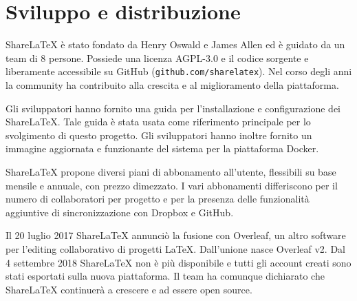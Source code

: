 \section{Sviluppo e distribuzione}
ShareLaTeX è stato fondato da Henry Oswald e James Allen ed è guidato da un team di 8 persone. Possiede una licenza AGPL-3.0 e il codice sorgente e liberamente accessibile su GitHub (\verb|github.com/sharelatex|). Nel corso degli anni la community ha contribuito alla crescita e al miglioramento della piattaforma.

Gli sviluppatori hanno fornito una guida per l'installazione e configurazione dei ShareLaTeX. Tale guida è stata usata come riferimento principale per lo svolgimento di questo progetto. Gli sviluppatori hanno inoltre fornito un immagine aggiornata e funzionante del sistema per la piattaforma Docker.

ShareLaTeX propone diversi piani di abbonamento all'utente, flessibili su base mensile e annuale, con prezzo dimezzato. I vari abbonamenti differiscono per il numero di collaboratori per progetto e per la presenza delle funzionalità aggiuntive di sincronizzazione con Dropbox e GitHub.

Il 20 luglio 2017 ShareLaTeX annunciò la fusione con Overleaf, un altro software per l'editing collaborativo di progetti LaTeX. Dall'unione nasce Overleaf v2. Dal 4 settembre 2018 ShareLaTeX non è più disponibile e tutti gli account creati sono stati esportati sulla nuova piattaforma.
Il team ha comunque dichiarato che ShareLaTeX continuerà a crescere e ad essere open source.